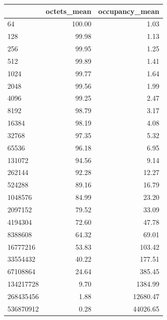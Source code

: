\begin{tabular}{lrr}
\toprule
 & octets_mean & occupancy_mean \\
\midrule
64 & 100.00 & 1.03 \\
128 & 99.98 & 1.13 \\
256 & 99.95 & 1.25 \\
512 & 99.89 & 1.41 \\
1024 & 99.77 & 1.64 \\
2048 & 99.56 & 1.99 \\
4096 & 99.25 & 2.47 \\
8192 & 98.79 & 3.17 \\
16384 & 98.19 & 4.08 \\
32768 & 97.35 & 5.32 \\
65536 & 96.18 & 6.95 \\
131072 & 94.56 & 9.14 \\
262144 & 92.28 & 12.27 \\
524288 & 89.16 & 16.79 \\
1048576 & 84.99 & 23.20 \\
2097152 & 79.52 & 33.09 \\
4194304 & 72.60 & 47.78 \\
8388608 & 64.32 & 69.01 \\
16777216 & 53.83 & 103.42 \\
33554432 & 40.22 & 177.51 \\
67108864 & 24.64 & 385.45 \\
134217728 & 9.70 & 1384.99 \\
268435456 & 1.88 & 12680.47 \\
536870912 & 0.28 & 44026.65 \\
\bottomrule
\end{tabular}
